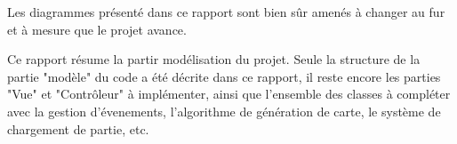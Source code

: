 Les diagrammes présenté dans ce rapport sont bien sûr amenés à changer au fur et à mesure que le projet avance.

Ce rapport résume la partir modélisation du projet. Seule la structure de la partie "modèle" du code a été décrite dans ce rapport, il reste encore les parties "Vue" et "Contrôleur" à implémenter, ainsi que l'ensemble des classes à compléter avec la gestion d'évenements, l'algorithme de génération de carte, le système de chargement de partie, etc.


